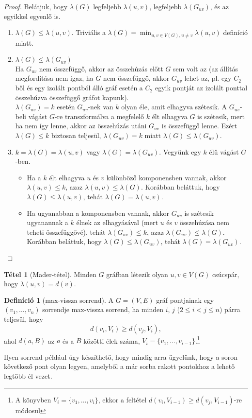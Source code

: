 \documentclass{article}
\theoremstyle{definition}
\newtheorem*{definicio}{Definíció}
\newtheorem*{tetel}{Tétel}
\begin{document}
\begin{proof}
Belátjuk, hogy $\lambda(G)$ legfeljebb $\lambda(u,v)$, legfeljebb $\lambda(G_{uv})$, és az egyikkel egyenlő is.

\begin{enumerate}
  \item $\lambda(G) \leq \lambda(u, v)$. Triviális a $\lambda(G) = \min_{u, v \in V(G), u \neq v} \lambda(u, v)$ definíció miatt.
  \item $\lambda(G) \leq \lambda(G_{uv}) $\\
  	Ha $G_{uv}$ nem összefüggő, akkor az összehúzás előtt $G$ sem volt az (az állítás megfordítása nem igaz, ha $G$ nem összefüggő, akkor $G_{uv}$ lehet az, pl. egy $C_2$-ből és egy izolált pontból álló gráf esetén a $C_2$ egyik pontját az izolált ponttal összehúzva összefüggő gráfot kapunk).\\
  	$\lambda(G_{uv}) = k$ esetén $G_{uv}$-nek van $k$ olyan éle, amit elhagyva szétesik. A $G_{uv}$-beli vágást $G$-re transzformálva a megfelelő $k$ élt elhagyva $G$ is szétesik, mert ha nem így lenne, akkor az összehúzás utáni $G_{uv}$ is összefüggő lenne. Ezért $\lambda(G) \leq k$ biztosan teljesül, $\lambda(G_{uv}) = k$ miatt $\lambda(G) \leq \lambda(G_{uv})$.
  \item $k = \lambda(G) = \lambda(u,v)$ vagy $\lambda(G) = \lambda(G_{uv})$. Vegyünk egy $k$ élű vágást $G$-ben.
 	\begin{itemize}
      \item Ha a $k$ élt elhagyva $u$ és $v$ különböző komponensben vannak, akkor $\lambda(u, v) \leq k$, azaz $\lambda(u,v) \leq \lambda(G)$. Korábban beláttuk, hogy $\lambda(G) \leq \lambda(u, v)$, tehát $\lambda(G) = \lambda(u, v)$.
      \item Ha ugyanabban a komponensben vannak, akkor $G_{uv}$ is szétesik ugyanannak a $k$ élnek az elhagyásával (mert  $u$ és $v$ összehúzása nem teheti összefüggővé), tehát $\lambda(G_{uv}) \leq k$, azaz $\lambda(G_{uv}) \leq \lambda(G)$. Korábban beláttuk, hogy $\lambda(G) \leq \lambda(G_{uv})$, tehát $\lambda(G) = \lambda(G_{uv})$. 
    \end{itemize}
\end{enumerate}
\end{proof}

\begin{tetel}[Mader-tétel]
Minden $G$ gráfban létezik olyan $u, v \in V(G)$ csúcspár, hogy $\lambda(u,v) = d(v)$.
\end{tetel}

\begin{definicio}[max-vissza sorrend]
A $G=(V,E)$ gráf pontjainak egy $(v_1, \dots, v_n)$ sorrendje max-vissza sorrend, ha minden $i$, $j$ ($2 \leq i < j \leq n$) párra teljesül, hogy
\[ d(v_i, V_i) \geq d(v_j, V_i), \]
ahol $d(a, B)$ az $a$ és a $B$ közötti élek száma, $V_i=\{v_1, \ldots, v_{i-1}\}$.\footnote{A könyvben $V_i = \{v_1, \ldots, v_i\}$, ekkor a feltétel $d(v_i, V_{i-1}) \geq d(v_j, V_{i-1})$-re módosul}

Ilyen sorrend például úgy készíthető, hogy mindig arra ügyelünk, hogy a soron következő pont olyan legyen, amelyből a már sorba rakott pontokhoz a lehető legtöbb él vezet.
\end{definicio}
\end{document}
